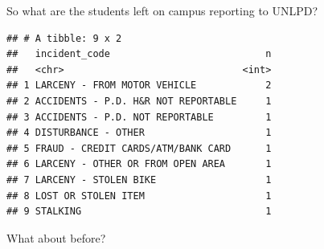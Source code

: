 \documentclass[]{book}
\newenvironment{Shaded}{\begin{snugshade}}{\end{snugshade}}
\newcommand{\DataTypeTok}[1]{\textcolor[rgb]{0.13,0.29,0.53}{#1}}
\newcommand{\DecValTok}[1]{\textcolor[rgb]{0.00,0.00,0.81}{#1}}
\newcommand{\KeywordTok}[1]{\textcolor[rgb]{0.13,0.29,0.53}{\textbf{#1}}}
\newcommand{\NormalTok}[1]{#1}
\newcommand{\OperatorTok}[1]{\textcolor[rgb]{0.81,0.36,0.00}{\textbf{#1}}}
\newcommand{\OtherTok}[1]{\textcolor[rgb]{0.56,0.35,0.01}{#1}}
\newcommand{\StringTok}[1]{\textcolor[rgb]{0.31,0.60,0.02}{#1}}
\begin{document}
So what are the students left on campus reporting to UNLPD?

\begin{Shaded}
\end{Shaded}

\begin{verbatim}
## # A tibble: 9 x 2
##   incident_code                           n
##   <chr>                               <int>
## 1 LARCENY - FROM MOTOR VEHICLE            2
## 2 ACCIDENTS - P.D. H&R NOT REPORTABLE     1
## 3 ACCIDENTS - P.D. NOT REPORTABLE         1
## 4 DISTURBANCE - OTHER                     1
## 5 FRAUD - CREDIT CARDS/ATM/BANK CARD      1
## 6 LARCENY - OTHER OR FROM OPEN AREA       1
## 7 LARCENY - STOLEN BIKE                   1
## 8 LOST OR STOLEN ITEM                     1
## 9 STALKING                                1
\end{verbatim}

What about before?
\end{document}
